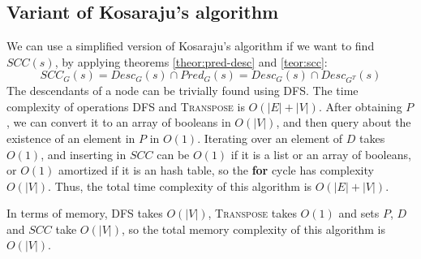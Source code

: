 \subsection{Variant of Kosaraju's algorithm} \label{algorithm-scc-kosaraju-v}
We can use a simplified version of Kosaraju's algorithm if we want to find $SCC(s)$, by applying theorems \ref{theor:pred-desc} and \ref{teor:scc}:
\begin{equation*}
    SCC_G(s) = Desc_G(s) \cap Pred_G(s) = Desc_G(s) \cap Desc_{G^T}(s) 
\end{equation*}
The descendants of a node can be trivially found using \acrshort{DFS}. The time complexity of operations \textsc{DFS} and \textsc{Transpose} is $O(|E|+|V|)$. After obtaining $P$, we can convert it to an array of booleans in $O(|V|)$, and then query about the existence of an element in $P$ in $O(1)$. Iterating over an element of $D$ takes $O(1)$, and inserting in $SCC$ can be $O(1)$ if it is a list or an array of booleans, or $O(1)$ amortized if it is an hash table, so the \textbf{for} cycle has complexity $O(|V|)$. Thus, the total time complexity of this algorithm is $O(|E|+|V|)$.\par
In terms of memory, \textsc{DFS} takes $O(|V|)$, \textsc{Transpose} takes $O(1)$ and sets $P$, $D$ and $SCC$ take $O(|V|)$, so the total memory complexity of this algorithm is $O(|V|)$.
